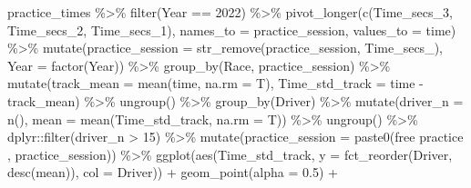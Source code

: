 \documentclass[
]{book}
\newenvironment{Shaded}{\begin{snugshade}}{\end{snugshade}}
\newcommand{\AttributeTok}[1]{\textcolor[rgb]{0.77,0.63,0.00}{#1}}
\newcommand{\DecValTok}[1]{\textcolor[rgb]{0.00,0.00,0.81}{#1}}
\newcommand{\FloatTok}[1]{\textcolor[rgb]{0.00,0.00,0.81}{#1}}
\newcommand{\FunctionTok}[1]{\textcolor[rgb]{0.00,0.00,0.00}{#1}}
\newcommand{\NormalTok}[1]{#1}
\newcommand{\SpecialCharTok}[1]{\textcolor[rgb]{0.00,0.00,0.00}{#1}}
\newcommand{\StringTok}[1]{\textcolor[rgb]{0.31,0.60,0.02}{#1}}
\begin{document}
\begin{Shaded}
\begin{Highlighting}[]
\NormalTok{practice\_times }\SpecialCharTok{\%\textgreater{}\%}
  \FunctionTok{filter}\NormalTok{(Year }\SpecialCharTok{==} \DecValTok{2022}\NormalTok{) }\SpecialCharTok{\%\textgreater{}\%} 
  \FunctionTok{pivot\_longer}\NormalTok{(}\FunctionTok{c}\NormalTok{(Time\_secs\_3, Time\_secs\_2, Time\_secs\_1), }\AttributeTok{names\_to =} \StringTok{\textquotesingle{}practice\_session\textquotesingle{}}\NormalTok{, }\AttributeTok{values\_to =} \StringTok{\textquotesingle{}time\textquotesingle{}}\NormalTok{) }\SpecialCharTok{\%\textgreater{}\%}
  \FunctionTok{mutate}\NormalTok{(}\AttributeTok{practice\_session =} \FunctionTok{str\_remove}\NormalTok{(practice\_session, }\StringTok{\textquotesingle{}Time\_secs\_\textquotesingle{}}\NormalTok{),}
         \AttributeTok{Year =} \FunctionTok{factor}\NormalTok{(Year)) }\SpecialCharTok{\%\textgreater{}\%}
   \FunctionTok{group\_by}\NormalTok{(Race, practice\_session) }\SpecialCharTok{\%\textgreater{}\%}
   \FunctionTok{mutate}\NormalTok{(}\AttributeTok{track\_mean =} \FunctionTok{mean}\NormalTok{(time, }\AttributeTok{na.rm =}\NormalTok{ T),}
          \AttributeTok{Time\_std\_track =}\NormalTok{ time }\SpecialCharTok{{-}}\NormalTok{ track\_mean) }\SpecialCharTok{\%\textgreater{}\%} 
   \FunctionTok{ungroup}\NormalTok{() }\SpecialCharTok{\%\textgreater{}\%} 
   \FunctionTok{group\_by}\NormalTok{(Driver) }\SpecialCharTok{\%\textgreater{}\%} 
   \FunctionTok{mutate}\NormalTok{(}\AttributeTok{driver\_n =} \FunctionTok{n}\NormalTok{(),}
          \AttributeTok{mean =} \FunctionTok{mean}\NormalTok{(Time\_std\_track, }\AttributeTok{na.rm =}\NormalTok{ T)) }\SpecialCharTok{\%\textgreater{}\%}
   \FunctionTok{ungroup}\NormalTok{() }\SpecialCharTok{\%\textgreater{}\%}
\NormalTok{   dplyr}\SpecialCharTok{::}\FunctionTok{filter}\NormalTok{(driver\_n }\SpecialCharTok{\textgreater{}} \DecValTok{15}\NormalTok{) }\SpecialCharTok{\%\textgreater{}\%} 
  \FunctionTok{mutate}\NormalTok{(}\AttributeTok{practice\_session =} \FunctionTok{paste0}\NormalTok{(}\StringTok{\textquotesingle{}free practice \textquotesingle{}}\NormalTok{, practice\_session)) }\SpecialCharTok{\%\textgreater{}\%}  
   \FunctionTok{ggplot}\NormalTok{(}\FunctionTok{aes}\NormalTok{(Time\_std\_track, }\AttributeTok{y =} \FunctionTok{fct\_reorder}\NormalTok{(Driver, }\FunctionTok{desc}\NormalTok{(mean)), }\AttributeTok{col =}\NormalTok{ Driver)) }\SpecialCharTok{+}
   \FunctionTok{geom\_point}\NormalTok{(}\AttributeTok{alpha =} \FloatTok{0.5}\NormalTok{) }\SpecialCharTok{+}

\end{Highlighting}
\end{Shaded}
\end{document}
